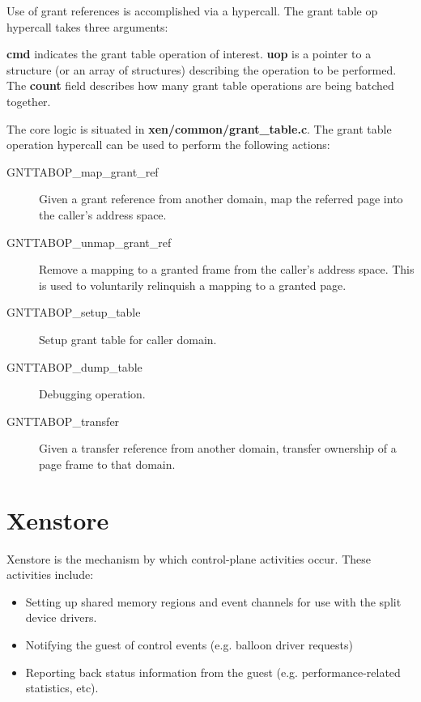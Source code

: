 \documentclass[11pt,twoside,final,openright]{report}
\newcommand{\hypercall}[1]{\vspace{2mm}{\sf #1}}
\begin{document}
Use of grant references is accomplished via a hypercall.  The grant
table op hypercall takes three arguments:

\hypercall{grant\_table\_op(unsigned int cmd, void *uop, unsigned int count)}

{\bf cmd} indicates the grant table operation of interest.  {\bf uop}
is a pointer to a structure (or an array of structures) describing the
operation to be performed.  The {\bf count} field describes how many
grant table operations are being batched together.

The core logic is situated in {\bf xen/common/grant\_table.c}.  The
grant table operation hypercall can be used to perform the following
actions:

\begin{description}
\item[GNTTABOP\_map\_grant\_ref] Given a grant reference from another
  domain, map the referred page into the caller's address space.
\item[GNTTABOP\_unmap\_grant\_ref] Remove a mapping to a granted frame
  from the caller's address space.  This is used to voluntarily
  relinquish a mapping to a granted page.
\item[GNTTABOP\_setup\_table] Setup grant table for caller domain.
\item[GNTTABOP\_dump\_table] Debugging operation.
\item[GNTTABOP\_transfer] Given a transfer reference from another
  domain, transfer ownership of a page frame to that domain.
\end{description}


\chapter{Xenstore}

Xenstore is the mechanism by which control-plane activities occur.
These activities include:

\begin{itemize}
\item Setting up shared memory regions and event channels for use with
  the split device drivers.
\item Notifying the guest of control events (e.g. balloon driver
  requests)
\item Reporting back status information from the guest
  (e.g. performance-related statistics, etc).
\end{itemize}
\end{document}
